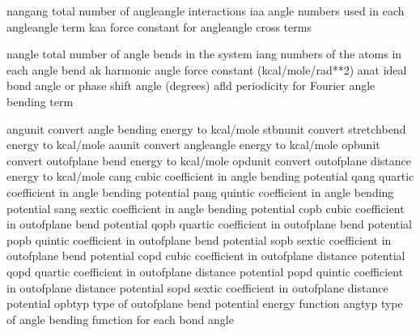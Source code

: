 \documentclass[letterpaper,11pt,english]{sphinxmanual}
\begin{document}
\sphinxAtStartPar
{}

\begin{sphinxVerbatim}[commandchars=\\\{\}]
nangang         total number of angle\PYGZhy{}angle interactions
iaa             angle numbers used in each angle\PYGZhy{}angle term
kaa             force constant for angle\PYGZhy{}angle cross terms
\end{sphinxVerbatim}

\sphinxAtStartPar
{}

\begin{sphinxVerbatim}[commandchars=\\\{\}]
nangle          total number of angle bends in the system
iang            numbers of the atoms in each angle bend
ak              harmonic angle force constant (kcal/mole/rad**2)
anat            ideal bond angle or phase shift angle (degrees)
afld            periodicity for Fourier angle bending term
\end{sphinxVerbatim}

\sphinxAtStartPar
{}

\begin{sphinxVerbatim}[commandchars=\\\{\}]
angunit         convert angle bending energy to kcal/mole
stbnunit        convert stretch\PYGZhy{}bend energy to kcal/mole
aaunit          convert angle\PYGZhy{}angle energy to kcal/mole
opbunit         convert out\PYGZhy{}of\PYGZhy{}plane bend energy to kcal/mole
opdunit         convert out\PYGZhy{}of\PYGZhy{}plane distance energy to kcal/mole
cang            cubic coefficient in angle bending potential
qang            quartic coefficient in angle bending potential
pang            quintic coefficient in angle bending potential
sang            sextic coefficient in angle bending potential
copb            cubic coefficient in out\PYGZhy{}of\PYGZhy{}plane bend potential
qopb            quartic coefficient in out\PYGZhy{}of\PYGZhy{}plane bend potential
popb            quintic coefficient in out\PYGZhy{}of\PYGZhy{}plane bend potential
sopb            sextic coefficient in out\PYGZhy{}of\PYGZhy{}plane bend potential
copd            cubic coefficient in out\PYGZhy{}of\PYGZhy{}plane distance potential
qopd            quartic coefficient in out\PYGZhy{}of\PYGZhy{}plane distance potential
popd            quintic coefficient in out\PYGZhy{}of\PYGZhy{}plane distance potential
sopd            sextic coefficient in out\PYGZhy{}of\PYGZhy{}plane distance potential
opbtyp          type of out\PYGZhy{}of\PYGZhy{}plane bend potential energy function
angtyp          type of angle bending function for each bond angle
\end{sphinxVerbatim}
\end{document}
